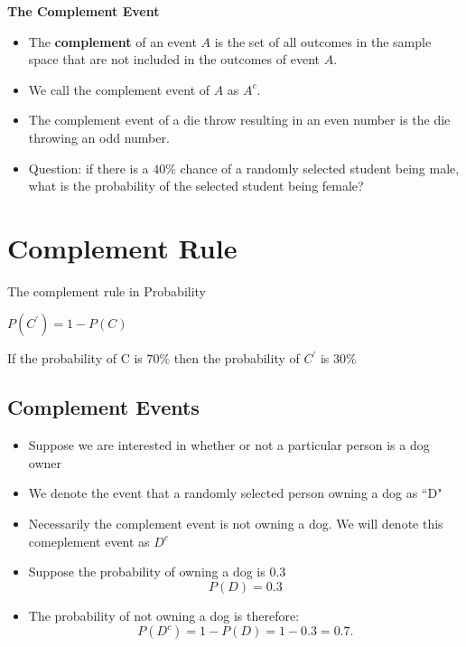 \documentclass[]{report}
\begin{document}
	{
		\textbf{The Complement Event}
		
		\begin{itemize} 
			
			\item The \textbf{complement} of an event $A$ is the set of all outcomes in the sample
			space that are not included in the outcomes of event $A$.
			\item We call the complement event of $A$ as $A^c$.
			\item The complement event of a die throw resulting in an even number is the
			die throwing an odd number.
			\item Question: if there is a $40\%$ chance of a randomly selected student being male, what is the probability of the selected student being female?
		\end{itemize}
	}

\section*{Complement Rule}



The complement rule in Probability

$P(C^{\prime}) = 1- P(C)$



If the probability of C is $70 \%$ then the probability of $C^{\prime}$ is $30\%$



\subsection{Complement Events}


\begin{itemize}
	\item Suppose we are interested in whether or not a particular person is a dog owner
	\item We denote the event that a randomly selected person owning a dog as ``D"
	\item Necessarily the complement event is not owning a dog. We will denote this comeplement event as $D^c$
	\item Suppose the probability of owning a dog is 0.3
	\[ P(D) = 0.3\]
	\item The probability of not owning a dog is therefore:
	\[ P(D^c) = 1- P(D) = 1-0.3 =0.7.\]
\end{itemize}
\end{document}
